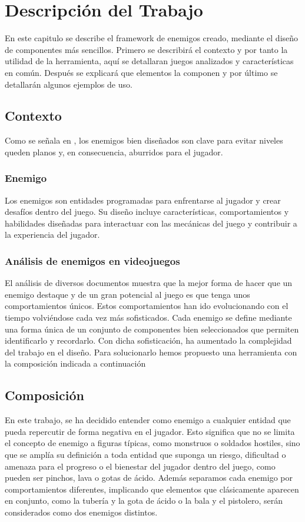 \chapter{Descripción del Trabajo}
\label{cap:descripcionTrabajo}
En este capitulo se describe el framework de enemigos creado, mediante el diseño de componentes más sencillos. 
Primero se describirá el contexto y por tanto la utilidad de la herramienta, aquí se detallaran juegos analizados y características en común. Después se explicará que elementos la componen y por último se detallarán algunos ejemplos de uso. \\
\section{Contexto}
Como se señala en  \citet{Build a Bad Guy Workshop}, los enemigos bien diseñados son clave para evitar niveles queden planos y, en consecuencia, aburridos para el jugador.
\subsection{Enemigo}
Los enemigos son entidades programadas para enfrentarse al jugador y crear desafíos dentro del juego. Su diseño incluye características, comportamientos y habilidades diseñadas para interactuar con las mecánicas del juego y contribuir a la experiencia del jugador. \\
\subsection{Análisis de enemigos en videojuegos}
El análisis de diversos documentos muestra que la mejor forma de hacer que un enemigo destaque y de un gran potencial al juego es que tenga unos comportamientos únicos. Estos comportamientos han ido evolucionando con el tiempo volviéndose cada vez más sofisticados. Cada enemigo se define mediante una forma única de un conjunto de componentes bien seleccionados que permiten identificarlo y recordarlo.
Con dicha sofisticación, ha aumentado la complejidad del trabajo en el diseño. Para solucionarlo hemos propuesto una herramienta con la  composición indicada a continuación

\section{Composición}
En este trabajo, se ha decidido entender como enemigo a cualquier entidad que pueda repercutir de forma negativa en el jugador. Esto significa que no se limita el concepto de enemigo a figuras típicas, como monstruos o soldados hostiles, sino que se amplía su definición a toda entidad que suponga un riesgo, dificultad o amenaza para el progreso o el bienestar del jugador dentro del juego, como pueden ser pinchos, lava o gotas de ácido.
Además separamos cada enemigo por comportamientos diferentes, implicando que elementos que clásicamente aparecen en conjunto, como la tubería y la gota de ácido o la bala y el pistolero, serán considerados como  dos enemigos distintos.\\

